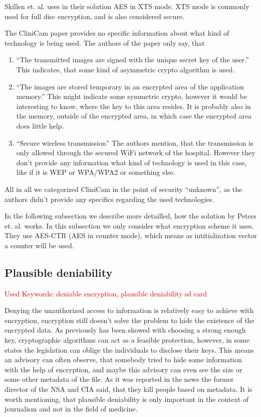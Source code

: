 \documentclass[12pt,a4paper,titlepage,oneside]{scrartcl}
\newcommand\todo[1]{\textcolor{red}{#1}}
\begin{document}
Skillen et. al. uses in their solution AES in XTS mode.
XTS mode is commonly used for full disc encryption, and is also considered secure. \cite{alomari2014implementation}

The CliniCam paper provides no specific information about what kind of technology is being used.
The authors of the paper only say, that
\begin{enumerate}[label={\alph*}]
  \item ``The transmitted images are signed with the unique secret key of the user.''
    This indicates, that some kind of asymmetric crypto algorithm is used.
  \item ``The images are stored temporary in an encrypted area of the application memory.''
    This might indicate some symmetric crypto, however it would be interesting to know, where the key to this area resides.
    It is probably also in the memory, outside of the encrypted area, in which case the encrypted area does little help.
  \item ``Secure wireless transmission''
    The authors mention, that the transmission is only allowed through the secured WiFi network of the hospital.
    However they don't provide any information what kind of technology is used in this case, like if it is WEP or WPA/WPA2 or something else.
\end{enumerate}
All in all we categorized CliniCam in the point of security ``unknown'', as the authors didn't provide any specifics regarding the used technologies. \cite{pmid25565678}

In the following subsection we describe more detailled, how the solution by Peters et. al. works.
In this subsection we only consider what encryption scheme it uses.
They use AES-CTR (AES in counter mode), which means as intitialization vector a counter will be used. \cite{peters2015defy}

\subsection{Plausible deniability}
\todo{Used Keywords: deniable encryption, plausible deniability sd card}

Denying the unauthorized access to information is relatively easy to achieve with encryption, encryption still doesn't solve the problem to hide the existence of the encrypted data.
As previously has been showed with choosing a strong enough key, cryptographic algorithms can act as a feasible protection, however, in some states the legislation can oblige the individuals to disclose their keys.
This means an advisory can often observe, that somebody tried to hide some information with the help of encryption, and maybe this advisory can even see the size or some other metadata of the file.
As it was reported in the news the former director of the NSA and CIA said, that they kill people based on metadata. \cite{coleMetadata}
It is worth mentioning, that plausible deniability is only important in the context of journalism and not in the field of medicine.
\end{document}
